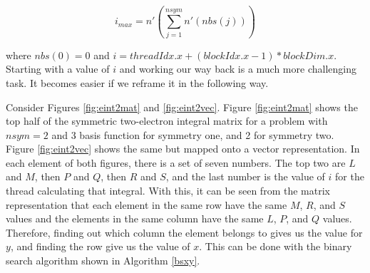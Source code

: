\documentclass[12pt]{report}
\begin{document}
\begin{equation}
\label{imax}
i_{max} = n'(\sum^{nsym}_{j = 1}n'(nbs(j)))
\end{equation}

where $nbs(0) = 0$ and $i=threadIdx.x + (blockIdx.x - 1) * blockDim.x$. Starting with a value of $i$ and working our way back is a much more challenging task. It becomes easier if we reframe it in the following way.

\clearpage

Consider Figures \ref{fig:eint2mat} and \ref{fig:eint2vec}. Figure \ref{fig:eint2mat} shows the top half of the symmetric two-electron integral matrix for a problem with $nsym = 2$ and 3 basis function for symmetry one, and 2 for symmetry two. Figure \ref{fig:eint2vec} shows the same but mapped onto a vector representation. In each element of both figures, there is a set of seven numbers. The top two are $L$ and $M$, then $P$ and $Q$, then $R$ and $S$, and the last number is the value of $i$ for the thread calculating that integral. With this, it can be seen from the matrix representation that each element in the same row have the same $M$, $R$, and $S$ values and the elements in the same column have the same $L$, $P$, and $Q$ values. Therefore, finding out which column the element belongs to gives us the value for $y$, and finding the row give us the value of $x$. This can be done with the binary search algorithm shown in Algorithm \ref{bsxy}.
\end{document}
